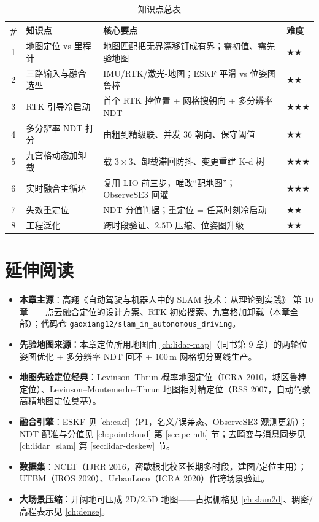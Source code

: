 \begin{table}[H]\centering\small
\caption{知识点总表}
\begin{tabular}{clll}
\toprule
\# & 知识点 & 核心要点 & 难度 \\
\midrule
1 & 地图定位 vs 里程计 & 地图匹配把无界漂移钉成有界；需初值、需先验地图 & $\bigstar\bigstar$ \\
2 & 三路输入与融合选型 & IMU/RTK/激光-地图；ESKF 平滑 vs 位姿图鲁棒 & $\bigstar\bigstar$ \\
3 & RTK 引导冷启动 & 首个 RTK 控位置 + 网格搜朝向 + 多分辨率 NDT & $\bigstar\bigstar\bigstar$ \\
4 & 多分辨率 NDT 打分 & 由粗到精级联、并发 $36$ 朝向、保守阈值 & $\bigstar\bigstar$ \\
5 & 九宫格动态加卸载 & 载 $3\times3$、卸载滞回防抖、变更重建 K-d 树 & $\bigstar\bigstar\bigstar$ \\
6 & 实时融合主循环 & 复用 LIO 前三步，唯改“配地图”；ObserveSE3 回灌 & $\bigstar\bigstar\bigstar$ \\
7 & 失效重定位 & NDT 分值判据；重定位 = 任意时刻冷启动 & $\bigstar\bigstar$ \\
8 & 工程泛化 & 跨时段验证、$2.5$D 压缩、位姿图升级 & $\bigstar\bigstar$ \\
\bottomrule
\end{tabular}
\end{table}

\section*{延伸阅读}
\begin{itemize}
  \item \textbf{本章主源}：高翔《自动驾驶与机器人中的 SLAM 技术：从理论到实践》\cite{gao2023slamad} 第 $10$ 章——点云融合定位的设计方案、RTK 初始搜索、九宫格加卸载（本章全部）；代码仓 \texttt{gaoxiang12/\allowbreak slam\_in\_autonomous\_driving}。
  \item \textbf{先验地图来源}：本章定位所用地图由 \cref{ch:lidar-map}（同书第 $9$ 章）的两轮位姿图优化 + 多分辨率 NDT 回环 + $100$\,m 网格切分离线生产。
  \item \textbf{地图先验定位经典}：Levinson--Thrun 概率地图定位\cite{levinson2010robust}（ICRA 2010，城区鲁棒定位）、Levinson--Montemerlo--Thrun 地图相对精定位\cite{levinson2007map}（RSS 2007，自动驾驶高精地图定位奠基）。
  \item \textbf{融合引擎}：ESKF 见 \cref{ch:eskf}（P1，名义/误差态、ObserveSE3 观测更新）；NDT 配准与分值见 \cref{ch:pointcloud} 第 \ref{sec:pc-ndt} 节；去畸变与消息同步见 \cref{ch:lidar_slam} 第 \ref{sec:lidar-deskew} 节。
  \item \textbf{数据集}：NCLT\cite{carlevaris2016nclt}（IJRR 2016，密歇根北校区长期多时段，建图/定位主用）；UTBM\cite{yan2020utbm}（IROS 2020）、UrbanLoco\cite{wen2020urbanloco}（ICRA 2020）作跨场景验证。
  \item \textbf{大场景压缩}：开阔地可压成 $2$D/$2.5$D 地图——占据栅格见 \cref{ch:slam2d}、稠密/高程表示见 \cref{ch:dense}。
\end{itemize}


